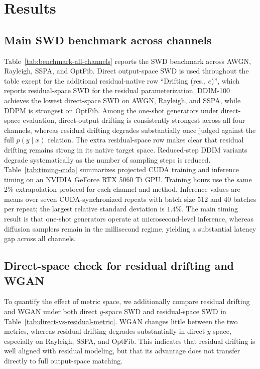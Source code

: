 \documentclass[conference]{IEEEtran}
\begin{document}
\section{Results}
\subsection{Main SWD benchmark across channels}
Table~\ref{tab:benchmark-all-channels} reports the SWD benchmark across AWGN, Rayleigh, SSPA, and
OptFib. Direct output-space SWD is used throughout the table except for the additional residual-native row ``Drifting (res., \(e\))'', which reports residual-space SWD for the residual parameterization. DDIM-100 achieves the lowest direct-space SWD on AWGN, Rayleigh, and SSPA, while DDPM is strongest on OptFib. Among the one-shot generators under direct-space evaluation, direct-output drifting is consistently strongest across all four channels, whereas residual drifting degrades substantially once judged against the full \(p(y \mid x)\) relation. The extra residual-space row makes clear that residual drifting remains strong in its native target space. Reduced-step DDIM variants degrade systematically as the number of sampling steps is reduced.
Table~\ref{tab:timing-cuda} summarizes projected CUDA training and inference timing on an NVIDIA GeForce RTX 5060 Ti GPU.
Training hours use the same 2\% extrapolation protocol for each channel and method.
Inference values are means over seven CUDA-synchronized repeats with batch size \(512\) and \(40\) batches per repeat; the largest relative standard deviation is \(1.4\%\).
The main timing result is that one-shot generators operate at microsecond-level inference, whereas diffusion samplers remain in the millisecond regime, yielding a substantial latency gap across all channels.




\subsection{Direct-space check for residual drifting and WGAN}
To quantify the effect of metric space, we additionally compare residual drifting and WGAN under
both direct \(y\)-space SWD and residual-space SWD in Table~\ref{tab:direct-vs-residual-metric}.
WGAN changes little between the two metrics, whereas residual drifting degrades substantially in direct \(y\)-space, especially on Rayleigh, SSPA, and OptFib. This indicates that residual drifting is well aligned with residual modeling, but that its advantage does not transfer directly to full output-space matching.
\end{document}
